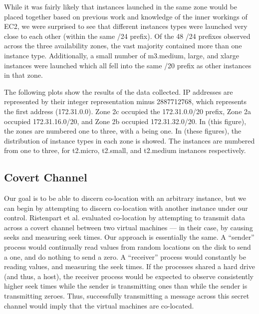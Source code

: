 \documentclass[conference]{IEEEtran}
\begin{document}
While it was fairly likely that instances launched in the same zone would be placed together based on previous 
work and knowledge of the inner workings of EC2, we were surprised to see that different instances types were launched 
very close to each other (within the same /24 prefix). 
Of the 48 /24 prefixes observed across the three availability zones, the vast majority contained more than one 
instance type. 
Additionally, a small number of m3.medium, large, and xlarge instances were launched which all fell into the same 
/20 prefix as other instances in that zone.

The following plots show the results of the data collected. 
IP addresses are represented by their integer representation minus 2887712768, which represents the first address 
(172.31.0.0). 
Zone 2c occupied the 172.31.0.0/20 prefix, Zone 2a occupied 172.31.16.0/20, and Zone 2b occupied 172.31.32.0/20. 
In (this figure), the zones are numbered one to three, with a being one.
In (these figures), the distribution of instance types in each zone is showed. The instances are numbered from 
one to three, for t2.micro, t2.small, and t2.medium instances respectively.
\subsection{Covert Channel}
Our goal is to be able to discern co-location with an arbitrary instance, but we can begin by attempting to discern
  co-location with another instance under our control.
Ristenpart et al. evaluated co-location by attempting to transmit data across a covert channel between two virtual
  machines --- in their case, by causing seeks and measuring seek times. Our approach is essentially the same.
A ``sender'' process would continually read values from random locations on the disk to send a one, and do nothing to
  send a zero.
A ``receiver'' process would constantly be reading values, and measuring the seek times.
If the processes shared a hard drive (and thus, a host), the receiver process would be expected to observe consistently
  higher seek times while the sender is transmitting ones than while the sender is transmitting zeroes.
Thus, successfully transmitting a message across this secret channel would imply that the virtual machines are
  co-located.
\end{document}
